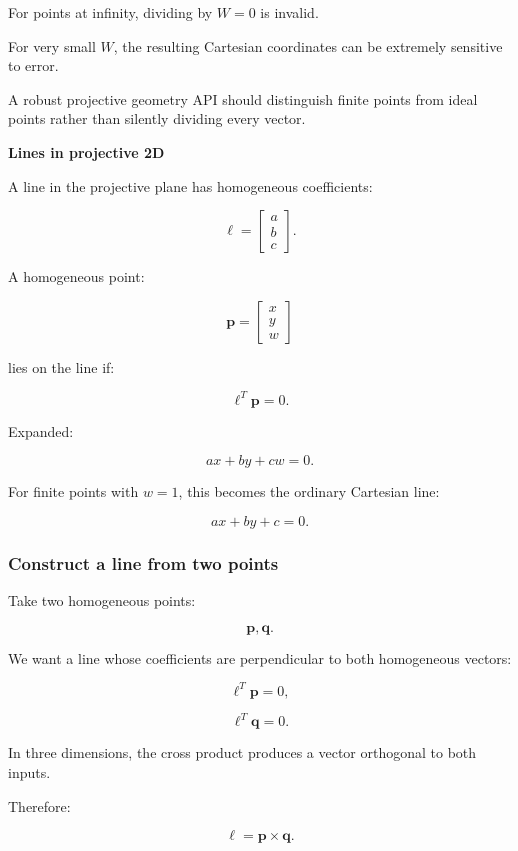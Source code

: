 For points at infinity, dividing by \(W=0\) is invalid.

For very small \(W\), the resulting Cartesian coordinates can be extremely sensitive to error.

A robust projective geometry API should distinguish finite points from ideal points rather than silently dividing every vector.

\textbf{Lines in projective 2D}

A line in the projective plane has homogeneous coefficients:

\[
 \boxed{ \boldsymbol\ell= \begin{bmatrix} a\\b\\c \end{bmatrix} }.
\]

A homogeneous point:

\[
 \mathbf p= \begin{bmatrix} x\\y\\w \end{bmatrix}
\]

lies on the line if:

\[
 \boxed{ \boldsymbol\ell^T\mathbf p=0 }.
\]

Expanded:

\[
 \boxed{ ax+by+cw=0 }.
\]

For finite points with \(w=1\), this becomes the ordinary Cartesian line:

\[
 ax+by+c=0.
\]

\subsubsection{Construct a line from two points}\label{02-foundations-ii-ch032-construct-a-line-from-two-points}

Take two homogeneous points:

\[
 \mathbf p,\mathbf q.
\]

We want a line whose coefficients are perpendicular to both homogeneous vectors:

\[
 \boldsymbol\ell^T\mathbf p=0,
\]

\[
 \boldsymbol\ell^T\mathbf q=0.
\]

In three dimensions, the cross product produces a vector orthogonal to both inputs.

Therefore:

\[
 \boxed{ \boldsymbol\ell=\mathbf p\times\mathbf q }.
\]


